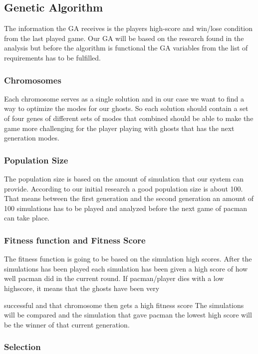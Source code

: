 \subsection{Genetic Algorithm}

The information the GA receives is the players high-score and win/lose condition from the last played game. Our GA will be based on the research found in the analysis but before the algorithm is functional the GA variables from the list of requirements has to be fulfilled. 


\subsubsection{Chromosomes}

Each chromosome serves as a single solution and in our case we want to find a way to optimize the modes for our ghosts. So each solution should contain a set of four genes of different sets of modes that combined should be able to make the game more challenging for the player playing with ghosts that has the next generation modes. 

\subsubsection{Population Size}

The population size is based on the amount of simulation that our system can provide. According to our initial research a good population size is about 100. That means between the first generation and the second generation an amount of 100 simulations has to be played and analyzed before the next game of pacman can take place.


\subsubsection{Fitness function and Fitness Score}

The fitness function is going to be based on the simulation high scores. After the simulations has been played each simulation has been given a high score of how well pacman did in the current round. If pacman/player dies with a low highscore, it means that the ghosts have been very 

successful and that chromosome then gets a high fitness score The simulations will be compared and the simulation that gave pacman the lowest high score will be the winner of that current generation.


\subsubsection{Selection}

